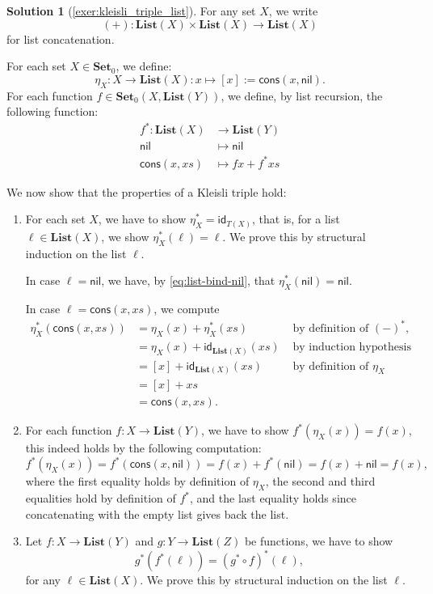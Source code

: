 \documentclass[a4paper,11pt, oneside,titlepage=false]{scrbook}
\theoremstyle{plain}
\theoremstyle{definition}
\newtheorem{solution}[thm]{Solution}
\newcommand{\cfont}[1]{\ensuremath{\mathsf{#1}}}
\newcommand{\Catb}[1]{\mathbf{#1}}
\newcommand{\List}{\Catb{List}}
\newcommand{\SET}{\Catb{Set}}
\newcommand{\Ob}[1]{{#1}_0}
\newcommand{\CHom}[3]{{#1}(#2,#3)}
\newcommand{\Id}[1][]{\cfont{id}_{#1}}
\newcommand{\nil}{\ensuremath{\mathsf{nil}}}
\newcommand{\cons}{\ensuremath{\mathsf{cons}}}
\newcommand{\co}[2]{\ensuremath{#2 \circ #1}}
\begin{document}
\begin{solution}[\cref{exer:kleisli_triple_list}]
  \label{sol:kleisli_triple_list}
  For any set $X$, we write
  \[ (+) : \List(X) \times \List(X) \to \List(X)\]
  for list concatenation.

  For each set $X\in\Ob \SET$, we define:
  \[
    \eta_X : X \to \List(X) : x\mapsto [x] := \cons(x,\nil).
  \]
  For each function $f\in\CHom{\Ob \SET}{X}{\List(Y)}$, we define, by list recursion, the following function:
  \begin{align}
    f^{*} : \List(X) &\to \List(Y)
    \\
    \nil & \mapsto \nil  \label{eq:list-bind-nil}
    \\
    \cons(x,xs) &\mapsto fx + f^*xs  \label{eq:list-bind-cons}
  \end{align}

We now show that the properties of a Kleisli triple hold:
\begin{enumerate}
\item For each set $X$, we have to show $\eta_X^{*} = \Id[T(X)]$,
  that is, for a list $\ell \in \List (X)$, we show $\eta_X^{*}(\ell) = \ell$.
  We prove this by structural induction on the list $\ell$.

  In case $\ell = \nil$, we have, by \cref{eq:list-bind-nil}, that $\eta_X^{*}(\nil) = \nil$.

  In case $\ell = \cons(x,xs)$, we compute
  \begin{align*}
    \eta_X^{*}(\cons(x,xs)) &= \eta_X(x) + \eta_X^{*}(xs) & \text{ by definition of } (-)^{*},
    \\
                            &= \eta_X(x) + \Id[\List(X)](xs)  & \text{ by induction hypothesis}
    \\
                            &= [x] + \Id[\List(X)](xs) & \text{ by definition of } \eta_X
    \\
                            &= [x] + xs
    \\
                            &= \cons(x,xs).
  \end{align*}



\item For each function $f:X\to \List(Y)$, we have to show $f^{*}(\eta_X(x)) = f(x)$, this indeed holds by the following computation:
\[
f^{*}(\eta_X(x)) = f^{*}(\cons(x,\nil)) = f(x) + f^{*}(\nil) = f(x) + \nil = f(x),
\]
where the first equality holds by definition of $\eta_X$, the second and third equalities hold by definition of $f^{*}$, and the last equality holds since concatenating with the empty list gives back the list.
\item Let $f:X\to \List(Y)$ and $g:Y\to \List(Z)$ be functions, we have to show
\[
g^{*}(f^{*}(\ell)) = (\co{f}{g^{*}})^{*}(\ell),
\]
for any $\ell \in \List(X)$.
 We prove this by structural induction on the list $\ell$.


\end{enumerate}
\end{solution}
\end{document}
